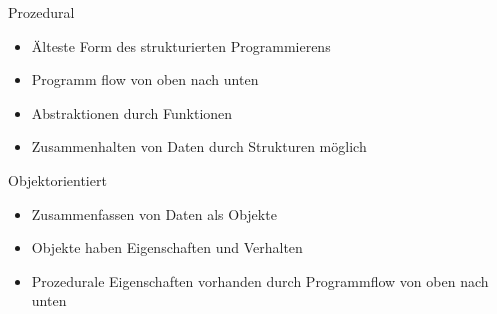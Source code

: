 \begin{frame}{Prozedural}
    \begin{itemize}
        \item Älteste Form des strukturierten Programmierens
        \item Programm flow von oben nach unten
        \item Abstraktionen durch Funktionen
        \item Zusammenhalten von Daten durch Strukturen möglich
    \end{itemize}

\end{frame}

\begin{frame}{Objektorientiert}
    \begin{itemize}
        \item Zusammenfassen von Daten als Objekte
        \item Objekte haben Eigenschaften und Verhalten
        \item Prozedurale Eigenschaften vorhanden durch Programmflow von oben nach unten
    \end{itemize}

\end{frame}


